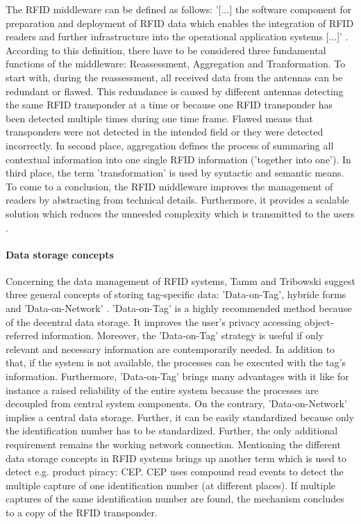The RFID middleware can be defined as follows: '[...] the software component for preparation and deployment of RFID data which enables the integration of RFID readers and further infrastructure into the operational application systems [...]' \cite[p.20 ff.]{fokus}. According to this definition, there have to be considered three fundamental functions of the middleware: Reassessment, Aggregation and Tranformation. To start with, during the reassessment, all received data from the antennas can be redundant or flawed. This redundance is caused by different antennas detecting the same RFID transponder at a time or because one RFID transponder has been detected multiple times during one time frame. Flawed means that transponders were not detected in the intended field or they were detected incorrectly. In second place, aggregation defines the process of summaring all contextual information into one single RFID information ('together into one'). In third place, the term 'transformation' is used by syntactic and semantic means. 
To come to a conclusion, the RFID middleware improves the management of readers by abstracting from technical details. Furthermore, it provides a scalable solution which reduces the unneeded complexity which is transmitted to the users \cite[p.20 ff.]{fokus}.   

\paragraph{Data storage concepts}

Concerning the data management of RFID systems, Tamm and Tribowski suggest three general concepts of storing tag-specific data: 'Data-on-Tag', hybride forms and 'Data-on-Network' \cite[p.22 ff.]{fokus}. 'Data-on-Tag' is a highly recommended method because of the decentral data storage. It improves the user's privacy accessing object-referred information. Moreover, the 'Data-on-Tag' strategy is useful if only relevant and necessary information are contemporarily needed. In addition to that, if the system is not available, the processes can be executed with the tag's information.
Furthermore, 'Data-on-Tag' brings many advantages with it like for instance a raised reliability of the entire system because the processes are decoupled from central system components. 
On the contrary, 'Data-on-Network' implies a central data storage. Further, it can be easily standardized because only the identification number has to be standardized. Further, the only additional requirement remains the working network connection. Mentioning the different data storage concepts in RFID systems brings up another term which is used to detect e.g. product piracy: \ac{CEP}. CEP uses compound read events to detect the multiple capture of one identification number (at different places). If multiple captures of the same identification number are found, the mechanism concludes to a copy of the RFID transponder. 

